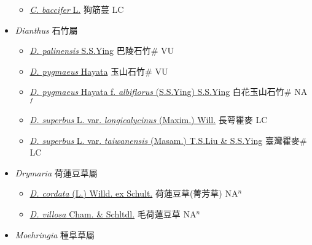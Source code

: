 \begin{itemize}
  \begin{itemize}
        \item[] \href{http://www.theplantlist.org/tpl1.1/search?q=Cucubalus+baccifer}{\textit{C. baccifer} L.}   狗筋蔓 LC
  \end{itemize}
 \item[] \textit{Dianthus} 石竹屬
                    
  \begin{itemize}
        \item[] \href{http://www.theplantlist.org/tpl1.1/search?q=Dianthus+palinensis}{\textit{D. palinensis} S.S.Ying}   巴陵石竹\# VU
        \item[] \href{http://www.theplantlist.org/tpl1.1/search?q=Dianthus+pygmaeus}{\textit{D. pygmaeus} Hayata}   玉山石竹\# VU
        \item[] \href{http://www.theplantlist.org/tpl1.1/search?q=Dianthus+pygmaeus+ f. +albiflorus}{\textit{D. pygmaeus} Hayata  f.  \textit{albiflorus} (S.S.Ying) S.S.Ying}   白花玉山石竹\# NA$^f$
        \item[] \href{http://www.theplantlist.org/tpl1.1/search?q=Dianthus+superbus+var.+longicalycinus}{\textit{D. superbus} L. var. \textit{longicalycinus} (Maxim.) Will.}   長萼瞿麥 LC
        \item[] \href{http://www.theplantlist.org/tpl1.1/search?q=Dianthus+superbus+var.+taiwanensis}{\textit{D. superbus} L. var. \textit{taiwanensis} (Masam.) T.S.Liu \& S.S.Ying}   臺灣瞿麥\# LC
  \end{itemize}
 \item[] \textit{Drymaria} 荷蓮豆草屬
                    
  \begin{itemize}
        \item[] \href{http://www.theplantlist.org/tpl1.1/search?q=Drymaria+cordata}{\textit{D. cordata} (L.) Willd. ex Schult.}     荷蓮豆草(菁芳草)   NA$^n$
        \item[] \href{http://www.theplantlist.org/tpl1.1/search?q=Drymaria+villosa}{\textit{D. villosa} Cham. \& Schltdl.}   毛荷蓮豆草 NA$^n$
  \end{itemize}
 \item[] \textit{Moehringia} 種阜草屬
                    

\end{itemize}
